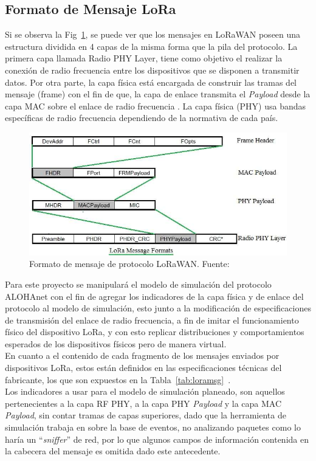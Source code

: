 \begin{justify}
\subsection{Formato de Mensaje LoRa}
Si se observa la Fig~\ref{fig:msg}, se puede ver que los mensajes en LoRaWAN poseen una estructura dividida en 4 capas de la misma forma que la pila del protocolo. La primera capa llamada Radio PHY Layer, tiene como objetivo el realizar la conexión de radio frecuencia entre los dispositivos que se disponen a transmitir datos. Por otra parte, la capa física está encargada de construir las tramas del mensaje (frame) con el fin de que, la capa de enlace transmita el \textit{Payload} desde la capa MAC sobre el enlace de radio frecuencia . La capa física (PHY) usa bandas específicas de radio frecuencia dependiendo de la normativa de cada país\cite{Sornin}.\\
\begin{figure}[!ht]
\includegraphics[scale=0.4]{images/LoRa-message-formats}
\caption{Formato de mensaje de protocolo LoRaWAN. Fuente:~\cite{Sornin}}
\label{fig:msg}
\end{figure}
\noindent
Para este proyecto se manipulará el modelo de simulación del protocolo ALOHAnet con el fin de agregar los indicadores de la capa física y de enlace del protocolo al modelo de simulación, esto junto a la modificación de especificaciones de transmisión del enlace de radio frecuencia, a fin de imitar el funcionamiento físico del dispositivo LoRa, y con esto replicar distribuciones y comportamientos esperados de los dispositivos físicos pero de manera virtual.\\
En cuanto a el contenido de cada fragmento de los mensajes enviados por dispositivos LoRa, estos están definidos en las especificaciones técnicas del fabricante, los que son expuestos en la Tabla~\ref{tab:loramsg}~\cite{Sornin}.\\
Los indicadores a usar para el modelo de simulación planeado, son aquellos pertenecientes a la capa RF PHY, a la capa PHY \textit{Payload} y la capa MAC \textit{Payload}, sin contar tramas de capas superiores, dado que la herramienta de simulación trabaja en sobre la base de eventos, no analizando paquetes como lo haría un ``\textit{sniffer}'' de red, por lo que algunos campos de información contenida en la cabecera del mensaje es omitida dado este antecedente.

\end{justify}
